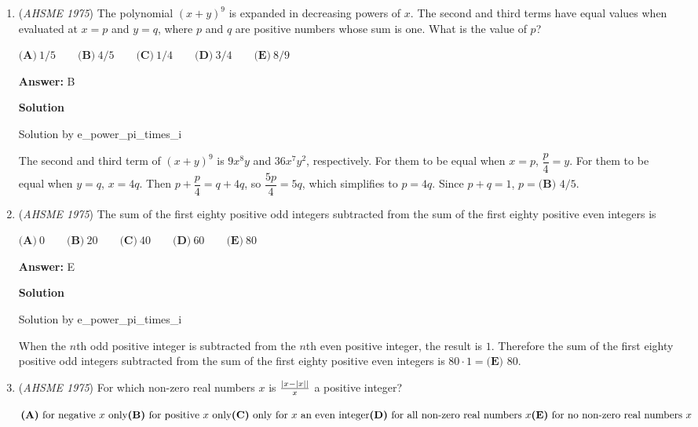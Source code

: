 \begin{enumerate}
 


	\item (\textit{AHSME 1975}) The polynomial $(x+y)^9$ is expanded in decreasing powers of $x$. The second and third terms have equal values 
when evaluated at $x=p$ and $y=q$, where $p$ and $q$ are positive numbers whose sum is one. What is the value of $p$? 


 $\textbf{(A)}\ 1/5 \qquad  \textbf{(B)}\ 4/5 \qquad  \textbf{(C)}\ 1/4 \qquad  \textbf{(D)}\ 3/4 \qquad  \textbf{(E)}\ 8/9$

 \textbf{Answer: }B



\textbf{Solution}

Solution by e\_power\_pi\_times\_i

 
The second and third term of $(x+y)^9$ is $9x^8y$ and $36x^7y^2$, respectively. For them to be equal when $x = p$, $\dfrac{p}{4} = y$. For them to be equal when $y = q$, $x = 4q$. Then $p+\dfrac{p}{4} = q+4q$, so $\dfrac{5p}{4} = 5q$, which simplifies to $p = 4q$. Since $p+q = 1$, $p = \boxed{\textbf{(B) } 4/5}$.

 


	\item (\textit{AHSME 1975}) The sum of the first eighty positive odd integers subtracted from the sum of the first eighty positive even integers is 


 $\textbf{(A)}\ 0 \qquad  \textbf{(B)}\ 20 \qquad  \textbf{(C)}\ 40 \qquad  \textbf{(D)}\ 60 \qquad  \textbf{(E)}\ 80$

 \textbf{Answer: }E



\textbf{Solution}

Solution by e\_power\_pi\_times\_i

 
When the $n$th odd positive integer is subtracted from the $n$th even positive integer, the result is $1$. Therefore the sum of the first eighty positive odd integers subtracted from the sum of the first eighty positive even integers is $80\cdot1 = \boxed{\textbf{(E) } 80}$.

 


	\item (\textit{AHSME 1975}) For which non-zero real numbers $x$ is $\frac{|x-|x|\-|}{x}$ a positive integer? 


 $\textbf{(A)}\ \text{for negative } x \text{ only} \qquad \\ \textbf{(B)}\ \text{for positive } x \text{ only} \qquad \\ \textbf{(C)}\ \text{only for } x \text{ an even integer} \qquad \\ \textbf{(D)}\ \text{for all non-zero real numbers } x \\ \textbf{(E)}\ \text{for no non-zero real numbers } x$


\end{enumerate}
